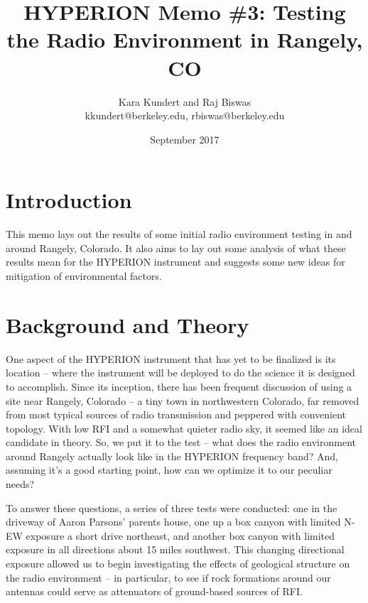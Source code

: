 \documentclass[11pt]{article}
\makeatletter
\newcommand{\thetitle}{HYPERION Memo \#3: Testing the Radio Environment in 
Rangely, CO}
\newcommand{\theauthor}{Kara Kundert and Raj Biswas}
\newcommand{\theauthorsemail}{kkundert@berkeley.edu, rbiswas@berkeley.edu}
\newcommand{\thedate}{September 2017}
\makeatother
\begin{document}
\title{
    \sffamily\bfseries\huge
    \thetitle \\
}
\author{
    \sffamily\theauthor \\
    \sffamily\theauthorsemail
}
\date{\thedate}
\maketitle
\sloppy

\section{Introduction}

This memo lays out the results of some initial radio environment testing in and 
around Rangely, Colorado. It also aims to lay out some analysis of what these 
results mean for the HYPERION instrument and suggests some new ideas for 
mitigation of environmental factors.

\section{Background and Theory}

One aspect of the HYPERION instrument that has yet to be finalized is its 
location -- where the instrument will be deployed to do the science it is 
designed to accomplish. Since its inception, there has been frequent discussion 
of using a site near Rangely, Colorado -- a tiny town in northwestern Colorado, 
far removed from most typical sources of radio transmission and peppered with 
convenient topology. With low RFI and a somewhat quieter radio sky, it seemed 
like an ideal candidate in theory. So, we put it to the test -- what does the 
radio environment around Rangely actually look like in the HYPERION frequency 
band?  And, assuming it's a good starting point, how can we optimize it to our 
peculiar needs?

To answer these questions, a series of three tests were conducted: one in the 
driveway of Aaron Parsons' parents house, one up a box canyon with limited N-EW 
exposure a short drive northeast, and another box canyon with limited exposure 
in all directions about 15 miles southwest. This changing directional exposure 
allowed us to begin investigating the effects of geological structure on the 
radio environment -- in particular, to see if rock formations around our 
antennas could serve as attenuators of ground-based sources of RFI. 
\end{document}
